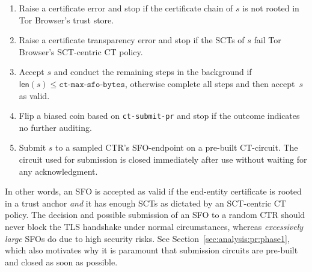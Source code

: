 \begin{enumerate}
	\item Raise a certificate error and stop if the certificate chain of $s$
		is not rooted in Tor Browser's trust store.
	\item Raise a certificate transparency error and stop if the SCTs of $s$
		fail Tor Browser's SCT-centric CT policy.
	\item Accept $s$ and conduct the remaining steps in the background if
		$\mathsf{len}(s) \le \texttt{ct-max-sfo-bytes}$, otherwise complete
		all steps and then accept~$s$ as valid.
	\item Flip a biased coin based on \texttt{ct-submit-pr} and stop if the
		outcome indicates no further auditing.
	\item Submit $s$ to a sampled CTR's SFO-endpoint on a pre-built CT-circuit.
		The circuit used for submission is closed immediately after use without
		waiting for any acknowledgment.
\end{enumerate}

In other words, an SFO is accepted as valid if the end-entity certificate is
rooted in a trust anchor \emph{and} it has enough SCTs as dictated by an
SCT-centric CT policy.  The decision and possible submission of an SFO to a
random CTR should never block the TLS handshake under normal circumstances,
whereas \emph{excessively large} SFOs do due to high security risks.  See
Section~\ref{sec:analysis:pr:phase1}, which also motivates why it is paramount
that submission circuits are pre-built and closed as soon as possible.

%
%

